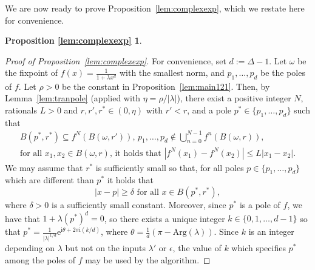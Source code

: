 \documentclass[11pt]{article}
\newtheorem*{lemcomplexexp}{Proposition \ref{lem:complexexp}}
\newcommand\Arg{\text{Arg}}
\newcommand{\fn}[2]{#1^{#2}}
\newcommand{\im}{\mathrm{i}}
\newcommand{\emm}{\mathrm{e}}
\begin{document}
We are now ready to prove Proposition~\ref{lem:complexexp}, which we restate here for convenience.
\begin{lemcomplexexp}
\statelemcomplexexp
\end{lemcomplexexp}
\begin{proof}[Proof of Proposition~\ref{lem:complexexp}]
For convenience, set $d:=\Delta-1$. Let $\omega$ be the fixpoint of $f(x)=\frac{1}{1+\lambda x^{d}}$ with the smallest norm, and $p_1,\hdots, p_{d}$ be the poles of $f$. Let $\rho>0$ be the constant in  Proposition~\ref{lem:main121}. Then, by Lemma~\ref{lem:tranpole} (applied with $\eta=\rho/|\lambda|$), there exist a positive  integer $N$, rationals $L>0$ and $r,r',r^*\in(0,\eta)$ with $r'<r$, and a pole $p^*\in \{p_1,\hdots, p_d\}$ such that  
\begin{gather}
\mbox{$B(p^*,r^*)\subseteq f^{N}(B(\omega,r'))$, \ \ \  $p_1,\hdots,p_d\notin \bigcup^{N-1}_{n=0}\fn{f}{n}(B(\omega,r))$,}\label{eq:f5g53423}\\
\mbox{for all $x_1,x_2\in B(\omega,r)$, it holds that $|f^{N}(x_1)-f^{N}(x_2)|\leq L|x_1-x_2|$.}\label{eq:4b32f2c24f}
\end{gather}
We may assume that $r^*$ is sufficiently small so that, for all poles $p\in \{p_1,\hdots,p_d\}$ which are different than $p^*$ it holds that 
\begin{equation}\label{eq:v4vrccww}
|x-p|\geq \delta \mbox{ for all } x\in B(p^*,r^*),
\end{equation} 
where $\delta>0$ is a sufficiently small constant. Moreover, since $p^*$ is a pole of $f$, we have that $1+\lambda (p^*)^d=0$, so there exists a unique integer $k\in\{0,1,\hdots, d-1\}$ so that $p^*=\frac{1}{|\lambda|^{1/d}}\emm^{\im\theta+2\pi\im (k/d)}$, where $\theta=\frac{1}{d}(\pi-\Arg(\lambda))$. Since $k$ is an integer depending on $\lambda$ but not on the inputs $\lambda'$ or 
$\epsilon$, the value of $k$ which specifies $p^*$ among the poles of $f$ may be used by the algorithm.


\end{proof}
\end{document}
